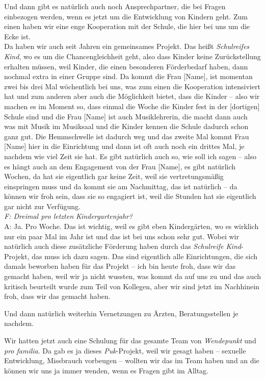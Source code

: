 \begin{linenumbers*}
Und dann gibt es natürlich auch noch Ansprechpartner, die bei Fragen einbezogen werden, wenn es jetzt um die Entwicklung von Kindern geht. Zum einen haben wir eine enge Kooperation mit der Schule, die hier bei uns um die Ecke ist.\\
Da haben wir auch seit Jahren ein gemeinsames Projekt. Das heißt \emph{Schulreifes Kind}, wo es um die Chancengleichheit geht, also dass Kinder keine Zurückstellung erhalten müssen, weil Kinder, die einen besonderen Förderbedarf haben, dann nochmal extra in einer Gruppe sind. Da kommt die Frau [Name], ist momentan zwei bis drei Mal wöchentlich bei uns, was zum einen die Kooperation intensiviert hat und zum anderen aber auch die Möglichkeit bietet, dass die Kinder -- also wir machen es im Moment so, dass einmal die Woche die Kinder fest in der [dortigen] Schule sind und die Frau [Name] ist auch Musiklehrerin, die macht dann auch was mit Musik im Musiksaal und die Kinder kennen die Schule dadurch schon ganz gut. Die Hemmschwelle ist dadurch weg und das zweite Mal kommt Frau [Name] hier in die Einrichtung und dann ist oft auch noch ein drittes Mal, je nachdem wie viel Zeit sie hat. Es gibt natürlich auch so, wie soll ich sagen -- also es hängt auch an dem Engagement von der Frau [Name], es gibt natürlich Wochen, da hat sie eigentlich gar keine Zeit, weil sie vertretungsmäßig einspringen muss und da kommt sie am Nachmittag, das ist natürlich -- da können wir froh sein, dass sie so engagiert ist, weil die Stunden hat sie eigentlich gar nicht zur Verfügung.\\
\emph{F: Dreimal pro letzten Kindergartenjahr?}\\
A: Ja. Pro Woche. Das ist wichtig, weil es gibt eben Kindergärten, wo es wirklich nur ein paar Mal im Jahr ist und das ist bei uns schon sehr gut. Wobei wir natürlich auch diese zusätzliche Förderung haben durch das \emph{Schulreife Kind}-Projekt, das muss ich dazu sagen. Das sind eigentlich alle Einrichtungen, die sich damals beworben haben für das Projekt -- ich bin heute froh, dass wir das gemacht haben, weil wir ja nicht wussten, was kommt da auf uns zu und das auch kritisch beurteilt wurde zum Teil von Kollegen, aber wir sind jetzt im Nachhinein froh, dass wir das gemacht haben.  

Und dann natürlich weiterhin Vernetzungen zu Ärzten, Beratungsstellen je nachdem.  

Wir hatten jetzt auch eine Schulung für das gesamte Team von \emph{Wendepunkt} und \emph{pro familia}. Da gab es ja dieses \emph{Puk}-Projekt, weil wir gesagt haben -- sexuelle Entwicklung, Missbrauch vorbeugen -- wollten wir das im Team haben und an die können wir uns ja immer wenden, wenn es Fragen gibt im Alltag.  


\end{linenumbers*}

